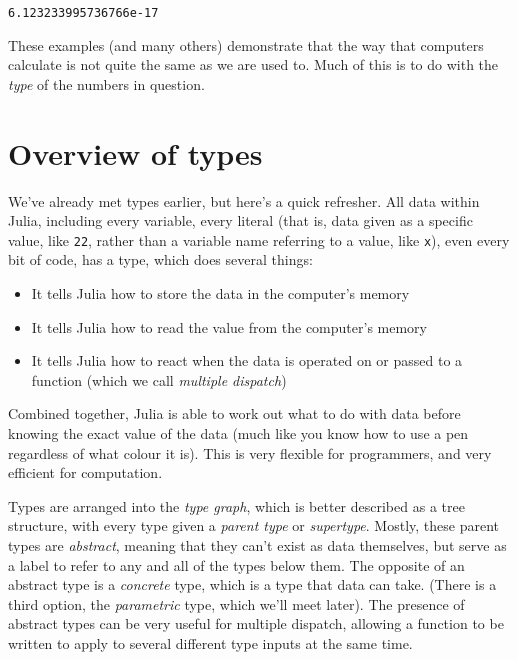 \documentclass[
  letterpaper,
  DIV=11,
  numbers=noendperiod]{scrreprt}
\begin{document}
\begin{verbatim}
6.123233995736766e-17
\end{verbatim}

These examples (and many others) demonstrate that the way that computers
calculate is not quite the same as we are used to. Much of this is to do
with the \emph{type} of the numbers in question.

\hypertarget{overview-of-types}{%
\section{Overview of types}\label{overview-of-types}}

We've already met types earlier, but here's a quick refresher. All data
within Julia, including every variable, every literal (that is, data
given as a specific value, like \texttt{22}, rather than a variable name
referring to a value, like \texttt{x}), even every bit of code, has a
type, which does several things:

\begin{itemize}
\item
  It tells Julia how to store the data in the computer's memory
\item
  It tells Julia how to read the value from the computer's memory
\item
  It tells Julia how to react when the data is operated on or passed to
  a function (which we call \emph{multiple dispatch})
\end{itemize}

Combined together, Julia is able to work out what to do with data before
knowing the exact value of the data (much like you know how to use a pen
regardless of what colour it is). This is very flexible for programmers,
and very efficient for computation.

Types are arranged into the \emph{type graph}, which is better described
as a tree structure, with every type given a \emph{parent type} or
\emph{supertype}. Mostly, these parent types are \emph{abstract},
meaning that they can't exist as data themselves, but serve as a label
to refer to any and all of the types below them. The opposite of an
abstract type is a \emph{concrete} type, which is a type that data can
take. (There is a third option, the \emph{parametric} type, which we'll
meet later). The presence of abstract types can be very useful for
multiple dispatch, allowing a function to be written to apply to several
different type inputs at the same time.
\end{document}

